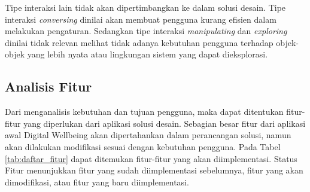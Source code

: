 Tipe interaksi lain tidak akan dipertimbangkan ke dalam solusi desain. Tipe interaksi \textit{conversing} dinilai akan membuat pengguna kurang efisien dalam melakukan pengaturan. Sedangkan tipe interaksi \textit{manipulating} dan \textit{exploring} dinilai tidak relevan melihat tidak adanya kebutuhan pengguna terhadap objek-objek yang lebih nyata atau lingkungan sistem yang dapat dieksplorasi.

\subsection{Analisis Fitur}
\label{subsec:analisis_fitur}

Dari menganalisis kebutuhan dan tujuan pengguna, maka dapat ditentukan fitur-fitur yang diperlukan dari aplikasi solusi desain. Sebagian besar fitur dari aplikasi awal Digital Wellbeing akan dipertahankan dalam perancangan solusi, namun akan dilakukan modifikasi sesuai dengan kebutuhan pengguna. Pada Tabel \ref{tab:daftar_fitur} dapat ditemukan fitur-fitur yang akan diimplementasi. Status Fitur menunjukkan fitur yang sudah diimplementasi sebelumnya, fitur yang akan dimodifikasi, atau fitur yang baru diimplementasi.

